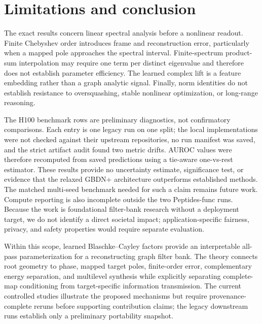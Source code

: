 \section{Limitations and conclusion}
\label{sec:conclusion}

The exact results concern linear spectral analysis before a nonlinear readout. Finite Chebyshev order introduces frame and reconstruction error, particularly when a mapped pole approaches the spectral interval. Finite-spectrum product-sum interpolation may require one term per distinct eigenvalue and therefore does not establish parameter efficiency. The learned complex lift is a feature embedding rather than a graph analytic signal. Finally, norm identities do not establish resistance to oversquashing, stable nonlinear optimization, or long-range reasoning.

The H100 benchmark rows are preliminary diagnostics, not confirmatory comparisons. Each entry is one legacy run on one split; the local implementations were not checked against their upstream repositories, no run manifest was saved, and the strict artifact audit found two metric drifts. AUROC values were therefore recomputed from saved predictions using a tie-aware one-vs-rest estimator. These results provide no uncertainty estimate, significance test, or evidence that the relaxed GBDN+ architecture outperforms established methods. The matched multi-seed benchmark needed for such a claim remains future work. Compute reporting is also incomplete outside the two Peptides-func runs. Because the work is foundational filter-bank research without a deployment target, we do not identify a direct societal impact; application-specific fairness, privacy, and safety properties would require separate evaluation.

Within this scope, learned Blaschke--Cayley factors provide an interpretable all-pass parameterization for a reconstructing graph filter bank. The theory connects root geometry to phase, mapped target poles, finite-order error, complementary energy separation, and multilevel synthesis while explicitly separating complete-map conditioning from target-specific information transmission. The current controlled studies illustrate the proposed mechanisms but require provenance-complete reruns before supporting contribution claims; the legacy downstream runs establish only a preliminary portability snapshot.

